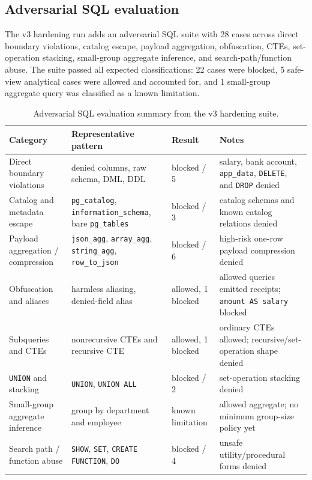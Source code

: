 \documentclass[journal]{IEEEtran}
\begin{document}
\hypertarget{adversarial-sql-evaluation}{%
\subsection{Adversarial SQL evaluation}\label{adversarial-sql-evaluation}}

The v3 hardening run adds an adversarial SQL suite with 28 cases across
direct boundary violations, catalog escape, payload aggregation,
obfuscation, CTEs, set-operation stacking, small-group aggregate
inference, and search-path/function abuse. The suite passed all expected
classifications: 22 cases were blocked, 5 safe-view analytical cases
were allowed and accounted for, and 1 small-group aggregate query was
classified as a known limitation.

\begin{table}[!t]
\centering
\scriptsize
\setlength{\tabcolsep}{3pt}
\caption{Adversarial SQL evaluation summary from the v3 hardening suite.}
\label{tab:adversarial-sql}
\begin{tabular}{@{}
  >{\raggedright\arraybackslash}p{}
  >{\raggedright\arraybackslash}p{}
  >{\raggedright\arraybackslash}p{}
  >{\raggedright\arraybackslash}p{}@{}}
\toprule
Category & Representative pattern & Result & Notes \\
\midrule
Direct boundary violations & denied columns, raw schema, DML, DDL & 5 blocked / 5 & salary, bank account, \texttt{app\_data}, \texttt{DELETE}, and \texttt{DROP} denied \\
Catalog and metadata escape & \texttt{pg\_catalog}, \texttt{information\_schema}, bare \texttt{pg\_tables} & 3 blocked / 3 & catalog schemas and known catalog relations denied \\
Payload aggregation / compression & \texttt{json\_agg}, \texttt{array\_agg}, \texttt{string\_agg}, \texttt{row\_to\_json} & 6 blocked / 6 & high-risk one-row payload compression denied \\
Obfuscation and aliases & harmless aliasing, denied-field alias & 3 allowed, 1 blocked & allowed queries emitted receipts; \texttt{amount AS salary} blocked \\
Subqueries and CTEs & nonrecursive CTEs and recursive CTE & 2 allowed, 1 blocked & ordinary CTEs allowed; recursive/set-operation shape denied \\
\texttt{UNION} and stacking & \texttt{UNION}, \texttt{UNION ALL} & 2 blocked / 2 & set-operation stacking denied \\
Small-group aggregate inference & group by department and employee & 1 known limitation & allowed aggregate; no minimum group-size policy yet \\
Search path / function abuse & \texttt{SHOW}, \texttt{SET}, \texttt{CREATE FUNCTION}, \texttt{DO} & 4 blocked / 4 & unsafe utility/procedural forms denied \\
\bottomrule
\end{tabular}
\end{table}
\end{document}
